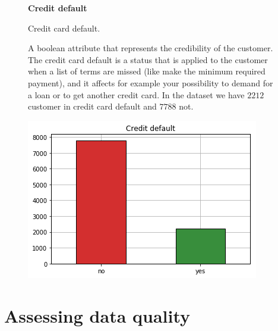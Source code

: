 \begin{figure}[ht]
  \begin{minipage}[h]{.60\textwidth}
        {\Large \textbf{Credit default}}
        
        Credit card default.
        
        A boolean attribute that represents the credibility of the customer.
        The credit card default is a status that is applied to the customer when a list of terms are missed (like make the minimum required payment), and it affects for example your possibility to demand for a loan or to get another credit card. In the dataset we have $2212$ customer in credit card default and $7788$ not. 
        
  \end{minipage}
  \begin{minipage}[h]{.40\textwidth}
    \includegraphics[width=.95\textwidth]{img/ch2/credit_default}
  \end{minipage}
\end{figure}

\clearpage

\section{Assessing data quality}

